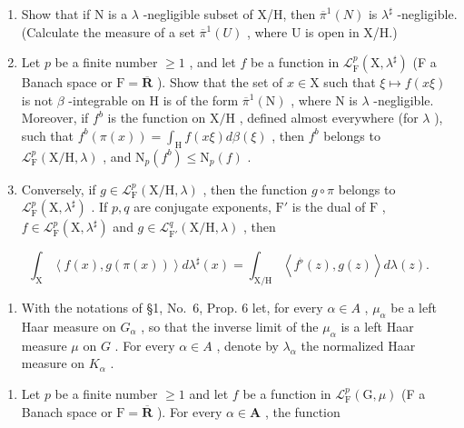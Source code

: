 \begin{enumerate}
\def\labelenumi{\alph{enumi})}
\item
  Show that if N is a \(\lambda\) -negligible subset of X/H, then \(\overline{\pi}^{1}(N)\) is \(\lambda^{\sharp}\) -negligible. (Calculate the measure of a set \(\overline{\pi}^{1}(U)\) , where U is open in X/H.)
\item
  Let \(p\) be a finite number \(\geqslant 1\) , and let \(f\) be a function in \(\mathcal{L}_{\mathrm{F}}^{p}(\mathrm{X},\lambda^{\sharp})\) (F a Banach space or \(\mathrm{F} = \overline{\mathbf{R}}\) ). Show that the set of \(x \in \mathrm{X}\) such that \(\xi \mapsto f(x\xi)\) is not \(\beta\) -integrable on \(\mathrm{H}\) is of the form \(\overline{\pi}^{1}(\mathrm{N})\) , where \(\mathrm{N}\) is \(\lambda\) -negligible. Moreover, if \(f^b\) is the function on \(\mathrm{X / H}\) , defined almost everywhere (for \(\lambda\) ), such that \(f^b (\pi (x)) = \int_{\mathrm{H}} f(x\xi) d\beta (\xi)\) , then \(f^b\) belongs to \(\mathcal{L}_{\mathrm{F}}^{p}(\mathrm{X / H},\lambda)\) , and \(\mathrm{N}_p(f^b)\leqslant \mathrm{N}_p(f)\) .
\item
  Conversely, if \(g \in \mathcal{L}_{\mathrm{F}}^{p}(\mathrm{X / H}, \lambda)\) , then the function \(g \circ \pi\) belongs to \(\mathcal{L}_{\mathrm{F}}^{p}(\mathrm{X}, \lambda^{\sharp})\) . If \(p, q\) are conjugate exponents, \(\mathrm{F}'\) is the dual of \(\mathrm{F}\) , \(f \in \mathcal{L}_{\mathrm{F}}^{p}(\mathrm{X}, \lambda^{\sharp})\) and \(g \in \mathcal{L}_{\mathrm{F}'}^{q}(\mathrm{X / H}, \lambda)\) , then
\end{enumerate}

\[
\int_ {\mathrm{X}} \left\langle f (x), g (\pi (x)) \right\rangle d \lambda^ {\sharp} (x) = \int_ {\mathrm{X/H}} \left\langle f ^ {\flat} (z), g (z) \right\rangle d \lambda (z).
\]

\begin{enumerate}
\def\labelenumi{\arabic{enumi})}
\setcounter{enumi}{9}
\tightlist
\item
  With the notations of §1, No.~6, Prop. 6 let, for every \(\alpha \in A\) , \(\mu_{\alpha}\) be a left Haar measure on \(G_{\alpha}\) , so that the inverse limit of the \(\mu_{\alpha}\) is a left Haar measure \(\mu\) on \(G\) . For every \(\alpha \in A\) , denote by \(\lambda_{\alpha}\) the normalized Haar measure on \(K_{\alpha}\) .
\end{enumerate}

\begin{enumerate}
\def\labelenumi{\alph{enumi})}
\tightlist
\item
  Let \(p\) be a finite number \(\geqslant 1\) and let \(f\) be a function in \(\mathcal{L}_{\mathrm{F}}^{p}(\mathrm{G},\mu)\) (F a Banach space or \(\mathrm{F} = \overline{\mathbf{R}}\) ). For every \(\alpha \in \mathbf{A}\) , the function
\end{enumerate}

